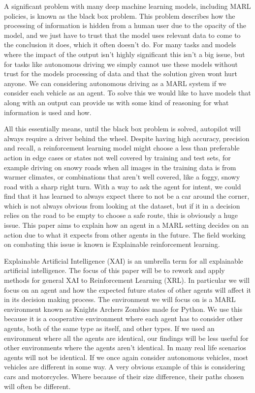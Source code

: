 \documentclass[UKenglish]{uiomasterthesis}
\begin{document}
A significant problem with many deep machine learning models, including MARL policies, is known as the black box problem\cite{zednik2019solving}. This problem describes how the processing of information is hidden from a human user due to the opacity of the model, and we just have to trust that the model uses relevant data to come to the conclusion it does, which it often doesn't do. For many tasks and models where the impact of the output isn't highly significant this isn't a big issue, but for tasks like autonomous driving we simply cannot use these models without trust for the models processing of data and that the solution given wont hurt anyone. We can considering autonomous driving as a MARL system if we consider each vehicle as an agent. To solve this we would like to have models that along with an output can provide us with some kind of reasoning for what information is used and how.

All this essentially means, until the black box problem is solved, autopilot will always require a driver behind the wheel\cite{tian2018deeptest}. Despite having high accuracy, precision and recall, a reinforcement learning model might choose a less than preferable action in edge cases or states not well covered by training and test sets, for example driving on snowy roads when all images in the training data is from warmer climates, or combinations that aren't well covered, like a foggy, snowy road with a sharp right turn.
With a way to ask the agent for intent, we could find that it has learned to always expect there to not be a car around the corner, which is not always obvious from looking at the dataset, but if it in a decision relies on the road to be empty to choose a safe route, this is obviously a huge issue. This paper aims to explain how an agent in a MARL setting decides on an action due to what it expects from other agents in the future. The field working on combating this issue is known is Explainable reinforcement learning.

Explainable Artificial Intelligence (XAI) is an umbrella term for all explainable artificial intelligence. The focus of this paper will be to rework and apply methods for general XAI to Reinforcement Learning (XRL). In particular we will focus on an agent and how the expected future states of other agents will affect it in its decision making process. The environment we will focus on is a MARL environment known as Knights Archers Zombies \cite{KAZ} made for Python. We use this because it is a cooperative environment where each agent has to consider other agents, both of the same type as itself, and other types. If we used an environment where all the agents are identical, our findings will be less useful for other environments where the agents aren't identical. In many real life scenarios agents will not be identical. If we once again consider autonomous vehicles, most vehicles are different in some way. A very obvious example of this is considering cars and motorcycles. Where because of their size difference, their paths chosen will often be different.
\end{document}
